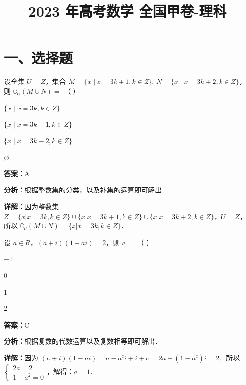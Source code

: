 ﻿\title{2023 年高考数学 全国甲卷-理科}
\date{}
\maketitle

\section*{一、选择题}

\begin{question}[points=5]
设全集 $U = Z$，集合 $M = \{ x \mid x = 3k + 1, k \in Z \}$, $N = \{ x \mid x = 3k + 2, k \in Z \}$，则 $\complement_U (M \cup N) = $ （   ）
\begin{choices}
  \item $\{ x \mid x = 3k, k \in Z \}$
  \item $\{ x \mid x = 3k - 1, k \in Z \}$
  \item $\{ x \mid x = 3k - 2, k \in Z \}$
  \item $\varnothing$
\end{choices}
\begin{solution}
\textbf{答案：}A

\textbf{分析：}根据整数集的分类，以及补集的运算即可解出．

\textbf{详解：}因为整数集 $Z = \{ x | x = 3k, k \in Z \} \cup \{ x | x = 3k + 1, k \in Z \} \cup \{ x | x = 3k + 2, k \in Z \}$，$U = Z$，所以 $\complement_U (M \cup N) = \{ x | x = 3k, k \in Z \}$．
\end{solution}
\end{question}

\begin{question}[points=5]
设 $a \in R$，$(a + i)(1 - ai) = 2$，则 $a = $ （       ）
\begin{choices}
  \item $-1$
  \item $0$
  \item $1$
  \item $2$
\end{choices}
\begin{solution}
\textbf{答案：}C

\textbf{分析：}根据复数的代数运算以及复数相等即可解出．

\textbf{详解：}因为 $(a + i)(1 - ai) = a - a^2 i + i + a = 2a + (1 - a^2)i = 2$，所以 $\begin{cases} 2a = 2 \\ 1 - a^2 = 0 \end{cases}$，解得：$a = 1$．
\end{solution}
\end{question}

